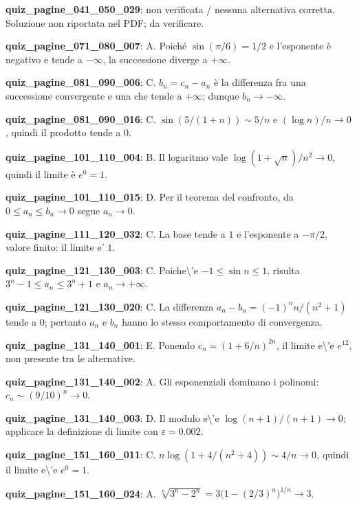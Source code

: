 \documentclass[11pt,a4paper]{article}
\newcounter{quiz}
\begin{document}
\noindent\textbf{quiz\_pagine\_041\_050\_029}: non verificata / nessuna alternativa corretta. Soluzione non riportata nel PDF; da verificare.\par\medskip
\noindent\textbf{quiz\_pagine\_071\_080\_007}: A. Poiché $\sin(\pi/6)=1/2$ e l'esponente è negativo e tende a $-\infty$, la successione diverge a $+\infty$.\par\medskip
\noindent\textbf{quiz\_pagine\_081\_090\_006}: C. $b_n=c_n-a_n$ è la differenza fra una successione convergente e una che tende a $+\infty$; dunque $b_n\to-\infty$.\par\medskip
\noindent\textbf{quiz\_pagine\_081\_090\_016}: C. $\sin(5/(1+n))\sim5/n$ e $(\log n)/n\to0$, quindi il prodotto tende a $0$.\par\medskip
\noindent\textbf{quiz\_pagine\_101\_110\_004}: B. Il logaritmo vale $\log(1+\sqrt n)/n^2\to0$, quindi il limite è $e^0=1$.\par\medskip
\noindent\textbf{quiz\_pagine\_101\_110\_015}: D. Per il teorema del confronto, da $0\leq a_n\leq b_n\to0$ segue $a_n\to0$.\par\medskip
\noindent\textbf{quiz\_pagine\_111\_120\_032}: C. La base tende a $1$ e l'esponente a $-\pi/2$, valore finito: il limite e' $1$.\par\medskip
\noindent\textbf{quiz\_pagine\_121\_130\_003}: C. Poiche\textbackslash{}'e $-1\leq\sin n\leq1$, risulta $3^n-1\leq a_n\leq3^n+1$ e $a_n\to+\infty$.\par\medskip
\noindent\textbf{quiz\_pagine\_121\_130\_020}: C. La differenza $a_n-b_n=(-1)^n n/(n^2+1)$ tende a $0$; pertanto $a_n$ e $b_n$ hanno lo stesso comportamento di convergenza.\par\medskip
\noindent\textbf{quiz\_pagine\_131\_140\_001}: E. Ponendo $c_n=(1+6/n)^{2n}$, il limite e\textbackslash{}'e $e^{12}$, non presente tra le alternative.\par\medskip
\noindent\textbf{quiz\_pagine\_131\_140\_002}: A. Gli esponenziali dominano i polinomi: $c_n\sim(9/10)^n\to0$.\par\medskip
\noindent\textbf{quiz\_pagine\_131\_140\_003}: D. Il modulo e\textbackslash{}'e $\log(n+1)/(n+1)\to0$; applicare la definizione di limite con $\varepsilon=0.002$.\par\medskip
\noindent\textbf{quiz\_pagine\_151\_160\_011}: C. $n\log(1+4/(n^2+4))\sim4/n\to0$, quindi il limite e\textbackslash{}'e $e^0=1$.\par\medskip
\noindent\textbf{quiz\_pagine\_151\_160\_024}: A. $\sqrt[n]{3^n-2^n}=3\bigl(1-(2/3)^n\bigr)^{1/n}\to3$.\par\medskip
\end{document}
